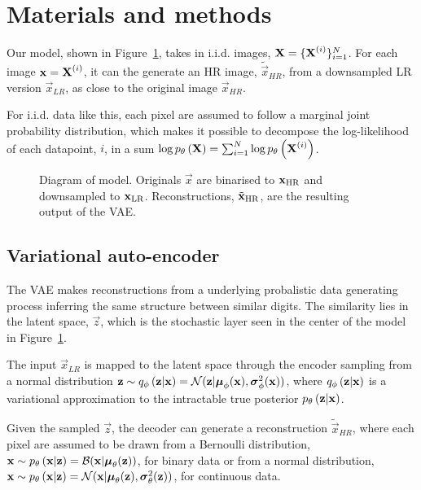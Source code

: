 \section{Materials and methods}
\label{sec:method}

Our model, shown in Figure~\ref{fig:diagram}, takes in i.i.d. images, $\bm{\mathrm{X}} = \{\bm{\mathrm{X}}^{(i)}\}^N_{i=1}$. For each image $\bm{\mathrm{x}} = \bm{\mathrm{X}}^{(i)}$, it can the generate an HR image, $\tilde{\vec{x}}_{HR}$, from a downsampled LR version $\vec{x}_{LR}$, as close to the original image $\vec{x}_{HR}$.

For i.i.d. data like this, each pixel are assumed to follow a marginal joint probability distribution, which makes it possible to decompose the log-likelihood of each datapoint, $i$, in a sum $\log p_{\theta}\left(\bm{\mathrm{X}}\right) = \sum^N_{i=1} \log p_{\theta}\left(\bm{\mathrm{X}}^{(i)}\right)$. 

\begin{figure*}
	\centering
	
	\caption{Diagram of model. Originals $\vec{x}$ are binarised to $\bm{\mathrm{x}}_{\text{HR}}$ and downsampled to $\bm{\mathrm{x}}_{\text{LR}}$. Reconstructions, $\tilde{\bm{\mathrm{x}}}_{\text{HR}}$, are the resulting output of the VAE.}
	\label{fig:diagram}
\end{figure*}

\subsection{Variational auto-encoder}
\label{sub:vae}

The VAE makes reconstructions from a underlying probalistic data generating process inferring the same structure between similar digits. The similarity lies in the latent space, $\vec{z}$, which is the stochastic layer seen in the center of the model in Figure~\ref{fig:diagram}. 

The input $\vec{x}_{LR}$ is mapped to the latent space through the encoder sampling from a normal distribution
$\bm{\mathrm{z}} \sim q_{\phi}\left(\bm{\mathrm{z}}|\bm{\mathrm{x}}\right) = \mathcal{N}( \bm{\mathrm{z}}|\bm{\mathrm{\mu}}_\phi(\bm{\mathrm{x}}),\bm{\mathrm{\sigma}}^2_\phi(\bm{\mathrm{x}}))$, where $q_{\phi}\left(\bm{\mathrm{z}}|\bm{\mathrm{x}}\right)$ is a variational approximation to the intractable true posterior $p_{\theta}\left(\bm{\mathrm{z}}|\bm{\mathrm{x}}\right)$.

Given the sampled $\vec{z}$, the decoder can generate a reconstruction $\tilde{\vec{x}}_{HR}$, where each pixel are assumed to be drawn from a Bernoulli distribution, $\bm{\mathrm{x}} \sim p_{\theta}\left(\bm{\mathrm{x}}|\bm{\mathrm{z}}\right)=\mathcal{B}( \bm{\mathrm{x}}|\bm{\mathrm{\mu}}_\theta(\bm{\mathrm{z}}))$, for binary data or from a normal distribution, $\bm{\mathrm{x}} \sim p_{\theta}\left(\bm{\mathrm{x}}|\bm{\mathrm{z}}\right)=\mathcal{N}( \bm{\mathrm{x}}|\bm{\mathrm{\mu}}_\theta(\bm{\mathrm{z}}),\bm{\mathrm{\sigma}}^2_\theta(\bm{\mathrm{z}}))$, for continuous data.


